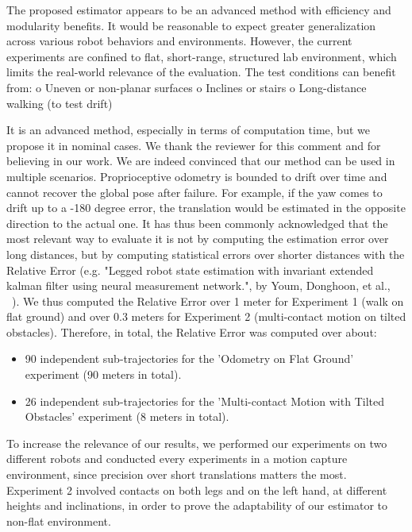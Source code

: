 \begin{revquote}
The proposed estimator appears to be an advanced method with efficiency and modularity benefits. It would be reasonable to expect greater generalization across various robot behaviors and environments.
However, the current experiments are confined to flat, short-range, structured lab environment, which limits the real-world relevance of the evaluation.
The test conditions can benefit from:
    o Uneven or non-planar surfaces
    o Inclines or stairs
    o Long-distance walking (to test drift)
\end{revquote}
\alert{It is an advanced method, especially in terms of computation time, but we propose it in nominal cases.}
We thank the reviewer for this comment and for believing in our work. We are indeed convinced that our method can be used in multiple scenarios. 
\io 
Proprioceptive odometry is bounded to drift over time and cannot recover the global pose after failure. For example, if the yaw comes to drift up to a -180 degree error, the translation would be estimated in the opposite direction to the actual one. It has thus been commonly acknowledged that the most relevant way to evaluate it is not by computing the estimation error over long distances, but by computing statistical errors over shorter distances with the Relative Error (e.g. "Legged robot state estimation with invariant extended kalman filter using neural measurement network.", by Youm, Donghoon, et al., ~\cite{yoon2023InvariantSmootherDynamicContactEventInformation}). We thus computed the Relative Error over 1 meter for Experiment 1 (walk on flat ground) and over 0.3 meters for Experiment 2 (multi-contact motion on tilted obstacles). Therefore, in total, the Relative Error was computed over about:
\begin{itemize}
    \item 90 independent sub-trajectories for the 'Odometry on Flat Ground' experiment (90 meters in total).
    \item 26 independent sub-trajectories for the 'Multi-contact Motion with Tilted Obstacles' experiment (8 meters in total).
\end{itemize}
To increase the relevance of our results, we performed our experiments on two different robots and conducted every experiments in a motion capture environment, since precision over short translations matters the most. Experiment 2 involved contacts on both legs and on the left hand, at different heights and inclinations, in order to prove the adaptability of our estimator to non-flat environment.



